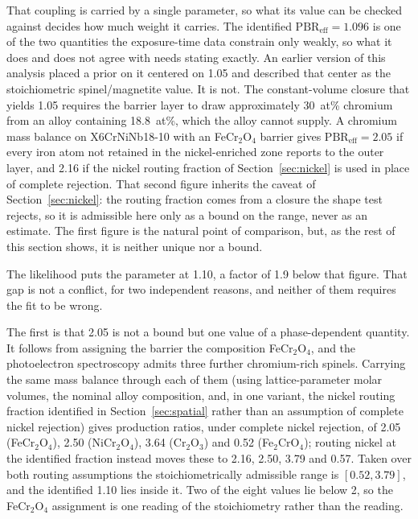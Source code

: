 \documentclass[pdflatex,sn-nature]{sn-jnl}
\begin{document}
That coupling is carried by a single parameter, so what its value can
be checked against decides how much weight it carries. The identified
$\mathrm{PBR}_\text{eff} = 1.096$ is one of the two
quantities the exposure-time data constrain only weakly, so what it does
and does not agree with needs stating exactly. An earlier
version of this analysis placed a prior on it centered on 1.05 and
described that center as the stoichiometric spinel/magnetite value. It is
not. The constant-volume closure that yields 1.05 requires the barrier
layer to draw approximately 30~at\% chromium from an alloy containing
18.8~at\%, which the alloy cannot supply. A chromium mass balance on
X6CrNiNb18-10 with an FeCr$_2$O$_4$ barrier gives
$\mathrm{PBR}_\text{eff} = 2.05$ if every iron atom not retained in the
nickel-enriched zone reports to the outer layer, and 2.16 if the nickel routing fraction of Section~\ref{sec:nickel} is used in place of complete rejection. That second figure inherits the caveat of Section~\ref{sec:nickel}: the routing fraction comes from a closure the shape test rejects, so it is admissible here only as a bound on the range, never as an estimate. The first figure is the natural point of comparison, but, as the rest of this section shows, it is neither unique nor a bound.

The likelihood puts the parameter at 1.10, a factor of 1.9 below that
figure. That gap is not a conflict, for two independent reasons, and
neither of them requires the fit to be wrong.

The first is that 2.05 is not a bound but one value of a
phase-dependent quantity. It follows from assigning the barrier the
composition FeCr$_2$O$_4$, and the photoelectron spectroscopy admits
three further chromium-rich spinels. Carrying the same mass balance
through each of them (using lattice-parameter molar volumes, the
nominal alloy composition, and, in one variant, the nickel routing
fraction identified in Section~\ref{sec:spatial} rather than an
assumption of complete nickel rejection) gives production ratios, under complete nickel
rejection, of 2.05 (FeCr$_2$O$_4$), 2.50 (NiCr$_2$O$_4$), 3.64
(Cr$_2$O$_3$) and 0.52 (Fe$_2$CrO$_4$); routing nickel at the identified
fraction instead moves these to 2.16, 2.50, 3.79 and 0.57. Taken over
both routing assumptions the stoichiometrically admissible range is
$[0.52, 3.79]$, and the identified 1.10 lies inside it. Two of the eight values lie below 2, so the FeCr$_2$O$_4$ assignment is one reading
of the stoichiometry rather than the reading.
\end{document}
